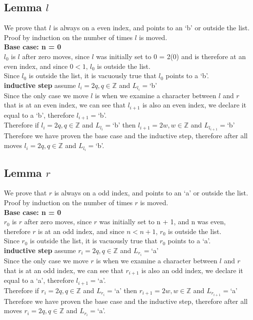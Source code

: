 \documentclass{article}
\begin{document}
    \subsection{Lemma $l$}
      We prove that $l$ is always on a even index, and points to an `b' or outside the list.\\
      Proof by induction on the number of times $l$ is moved.\\
      \textbf{Base case: n = 0}\\
      $l_{0}$ is $l$ after zero moves, since $l$ was initially set to 0 = 2(0) and is therefore at an even index, and since $0 < 1$, $l_{0}$ is outside the list.\\
      Since $l_{0}$ is outside the list, it is vacuously true that $l_{0}$ points to a `b'.\\
      \textbf{inductive step} assume $l_{i} = 2q, q \in \mathbb{Z}$ and $L_{l_{i}} = $`b'\\
      Since the only case we move $l$ is when we examine a character between $l$ and $r$ that is at an even index, we can see that $l_{i+1}$ is also an even index, we declare it equal to a `b', therefore $l_{i+1} = $`b'.\\
      Therefore if $l_{i} = 2q, q \in \mathbb{Z}$ and $L_{l_{i}} = $`b' then $l_{i+1} = 2w, w \in \mathbb{Z}$ and $L_{l_{i+1}} = $`b'\\
      Therefore we have proven the base case and the inductive step, therefore after all moves $l_{i} = 2q, q \in \mathbb{Z}$ and $L_{l_{i}} = $`b'.
    \subsection{Lemma $r$}
      We prove that $r$ is always on a odd index, and points to an `a' or outside the list.\\
      Proof by induction on the number of times $r$ is moved.\\
      \textbf{Base case: n = 0}\\
      $r_{0}$ is $r$ after zero moves, since $r$ was initially set to n + 1, and n was even, therefore $r$ is at an odd index, and since $n < n + 1$, $r_{0}$ is outside the list.\\
      Since $r_{0}$ is outside the list, it is vacuously true that $r_{0}$ points to a `a'.\\
      \textbf{inductive step} assume $r_{i} = 2q, q \in \mathbb{Z}$ and $L_{r_{i}} = $`a'\\
      Since the only case we move $r$ is when we examine a character between $l$ and $r$ that is at an odd index, we can see that $r_{i+1}$ is also an odd index, we declare it equal to a `a', therefore $l_{i+1} = $`a'.\\
      Therefore if $r_{i} = 2q, q \in \mathbb{Z}$ and $L_{r_{i}} = $`a' then $r_{i+1} = 2w, w \in \mathbb{Z}$ and $L_{r_{i+1}} = $`a'\\
      Therefore we have proven the base case and the inductive step, therefore after all moves $r_{i} = 2q, q \in \mathbb{Z}$ and $L_{r_{i}} = $`a'.
\end{document}
